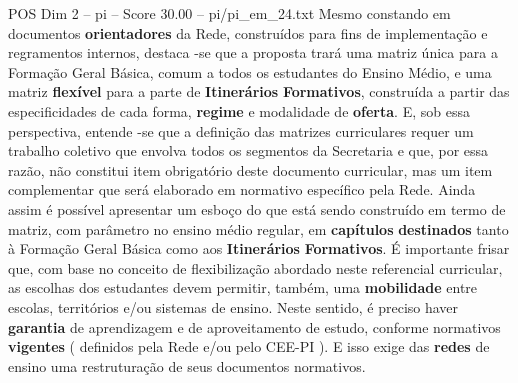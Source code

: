 \begin{textsample}{POS Dim 2 – pi – Score 30.00 – pi/pi\_em\_24.txt}
Mesmo constando em documentos \textbf{orientadores} da Rede, construídos para fins de implementação e regramentos internos, destaca -se que a proposta trará uma matriz única para a Formação Geral Básica, comum a todos os estudantes do Ensino Médio, e uma matriz \textbf{flexível} para a parte de \textbf{Itinerários} \textbf{Formativos}, construída a partir das especificidades de cada forma, \textbf{regime} e modalidade de \textbf{oferta}.
E, sob essa perspectiva, entende -se que a definição das matrizes curriculares requer um trabalho coletivo que envolva todos os segmentos da Secretaria e que, por essa razão, não constitui item obrigatório deste documento curricular, mas um item complementar que será elaborado em normativo específico pela Rede.
Ainda assim é possível apresentar um esboço do que está sendo construído em termo de matriz, com parâmetro no ensino médio regular, em \textbf{capítulos} \textbf{destinados} tanto à Formação Geral Básica como aos \textbf{Itinerários} \textbf{Formativos}.
É importante frisar que, com base no conceito de flexibilização abordado neste referencial curricular, as escolhas dos estudantes devem permitir, também, uma \textbf{mobilidade} entre escolas, territórios e/ou sistemas de ensino.
Neste sentido, é preciso haver \textbf{garantia} de aprendizagem e de aproveitamento de estudo, conforme normativos \textbf{vigentes} ( definidos pela Rede e/ou pelo CEE-PI ).
E isso exige das \textbf{redes} de ensino uma restruturação de seus documentos normativos.

\end{textsample}
